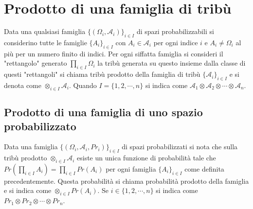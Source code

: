 \section{Prodotto di una famiglia di trib\`u}
Data una qualsiasi famiglia $\{(\Omega_i,\mathcal{A}_i)\}_{i\in I}$ di spazi probabilizzabili si considerino tutte le famiglie $\{A_i\}_{i\in I}$ con $A_i\in
\mathcal{A}_i$ per ogni indice $i$ e $A_i\neq\Omega_i$ al pi\`u per un numero finito di indici. Per ogni siffatta famiglia si consideri il "rettangolo" generato
$\prod\limits_{i\in I}\Omega_i$ la trib\`u generata su questo insieme dalla classe di questi "rettangoli" si chiama trib\`u prodotto della famiglia di trib\`u
$\{\mathcal{A}_i\}_{i\in I}$ e si denota come $\otimes_{i\in I}\mathcal{A}_{i}$. Quando $I=\{1,2,\cdots, n\}$ si indica come $\mathcal{A}_1\otimes
\mathcal{A}_2\otimes\cdots\otimes\mathcal{A}_n$.
\subsection{Prodotto di una famiglia di uno spazio probabilizzato}
Data una famiglia $\{(\Omega_i,\mathcal{A}_i, Pr_i)\}_{i\in I}$ di spazi probabilizzati si nota che sulla trib\`u prodotto $\otimes_{i\in I}\mathcal{A}_i$ 
esiste un unica funzione di probabilit\`a tale che $Pr(\prod\limits_{i\in I}A_i)=\prod\limits_{i\in I}Pr(A_i)$ per ogni famiglia $\{A_i\}_{i\in I}$ come 
definita precedentemente. Questa probabilit\`a si chiama probabilit\`a prodotto della famiglia e si indica come $\otimes_{i\in I}Pr(A_i)$. Se $i\in\{1,2,\cdots,
n\}$ si indica come $Pr_1\otimes Pr_2\otimes\cdots\otimes Pr_n$.